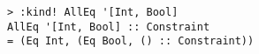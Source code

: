 \begin{repl}\begin{lstlisting}
> :kind! AllEq '[Int, Bool]
AllEq '[Int, Bool] :: Constraint
= (Eq Int, (Eq Bool, () :: Constraint))\end{lstlisting}\end{repl}
